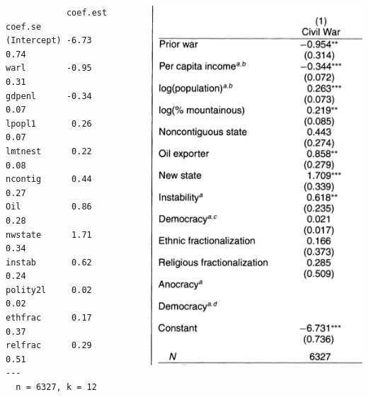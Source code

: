 \documentclass[handout]{beamer}
\begin{document}
\begin{frame}[fragile]
\begin{columns}[T] %
\begin{column}{.48\textwidth}
\begin{verbatim}
            coef.est coef.se
(Intercept) -6.73     0.74  
warl        -0.95     0.31  
gdpenl      -0.34     0.07  
lpopl1       0.26     0.07  
lmtnest      0.22     0.08  
ncontig      0.44     0.27  
Oil          0.86     0.28  
nwstate      1.71     0.34  
instab       0.62     0.24  
polity2l     0.02     0.02  
ethfrac      0.17     0.37  
relfrac      0.29     0.51  
---
  n = 6327, k = 12
\end{verbatim}

\end{column}%
\hfill%
\begin{column}{.48\textwidth}
\includegraphics[scale = .38]{figs/fearon-laitin-coefs.png}
\end{column}%
\end{columns}
\end{frame}
\end{document}
